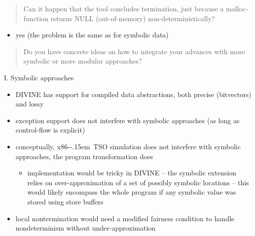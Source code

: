 \documentclass[aspectratio=169, fi]{paradise-slide}
\newcommand{\xtso}{\mbox{x86-\kern-.15em TSO}\xspace}
\newcommand{\rquote}[1]{\begin{quote}#1\end{quote}\bigskip\setlength{\leftmargini}{1em}}
\begin{document}
\begin{frame}[noframenumbering]{\qtitle}
  \rquote{Can it happen that the tool concludes termination, just because a malloc-function returns
    NULL (out-of-memory) non-deterministically?}
  \begin{itemize}
    \item yes (the problem is the same as for symbolic data)
  \end{itemize}
\end{frame}

\begin{frame}[noframenumbering]{\qtitle}
  \rquote{Do you have concrete ideas on how to integrate your advances with more symbolic or more
    modular approaches?}

  \textrm{I.} Symbolic approaches
  \begin{itemize}
    \item DIVINE has support for compiled data abstractions, both precise (bitvectors) and lossy
      \pause
    \item exception support does not interfere with symbolic approaches (as long as control-flow is
      explicit)
      \pause
    \item conceptually, \xtso simulation does not interfere with symbolic approaches, the program
      transformation does
      \begin{itemize}
        \item implementation would be tricky in DIVINE
          – the symbolic extension relies on over-approximation of a set of possibly symbolic
          locations – this would likely encompass the whole program if any symbolic value was stored
          using store buffers
      \end{itemize}
      \pause
    \item local nontermination would need a modified fairness condition to handle nondeterminism
      without under-approximation
  \end{itemize}
\end{frame}
\end{document}
